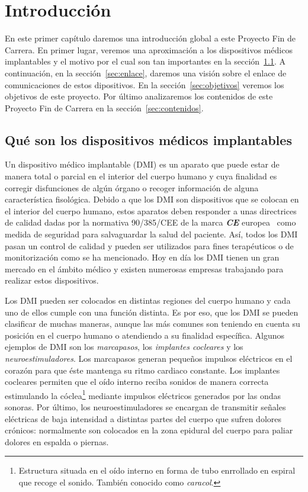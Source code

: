 \chapter{\textbf{Introducción}}\label{ch:intro}

En este primer capítulo daremos una introducción global a este Proyecto Fin de Carrera. En primer lugar, veremos una aproximación a los dispositivos médicos implantables y el motivo por el cual son tan importantes en la sección~\ref{sec:dmi}. A continuación, en la sección~\ref{sec:enlace}, daremos una visión sobre el enlace de comunicaciones de estos dipositivos. En la sección~\ref{sec:objetivos} veremos los objetivos de este proyecto. Por último analizaremos los contenidos de este Proyecto Fin de Carrera en la sección~\ref{sec:contenidos}.


\section{Qué son los dispositivos médicos implantables}\label{sec:dmi}

Un dispositivo médico implantable (DMI) es un aparato que puede estar de manera total o parcial en el interior del cuerpo humano y cuya finalidad es corregir disfunciones de algún órgano o recoger información de alguna característica fisológica. Debido a que los DMI son dispositivos que se colocan en el interior del cuerpo humano, estos aparatos deben responder a unas directrices de calidad dadas por la normativa 90/385/CEE \cite{ce385} de la marca \textbf{\textit{CE}} europea~\cite{ce} como medida de seguridad para salvaguardar la salud del paciente. Así, todos los DMI pasan un control de calidad y pueden ser utilizados para fines terapéuticos o de monitorización como se ha mencionado. Hoy en día los DMI tienen un gran mercado en el ámbito médico y existen numerosas empresas trabajando para realizar estos dispositivos.

Los DMI pueden ser colocados en distintas regiones del cuerpo humano y cada uno de ellos cumple con una función distinta. Es por eso, que los DMI se pueden clasificar de muchas maneras, aunque las más comunes son teniendo en cuenta su posición en el cuerpo humano o atendiendo a su finalidad específica. Algunos ejemplos de DMI son los \textit{marcapasos}, los \textit{implantes cocleares} y los \textit{neuroestimuladores}. Los marcapasos generan pequeños impulsos eléctricos en el corazón para que éste mantenga su ritmo cardiaco constante. Los implantes cocleares permiten que el oído interno reciba sonidos de manera correcta estimulando la cóclea\footnote{Estructura situada en el oído interno en forma de tubo enrrollado en espiral que recoge el sonido. También conocido como \textit{caracol}.} mediante impulsos eléctricos generados por las ondas sonoras. Por último, los neuroestimuladores se encargan de transmitir señales eléctricas de baja intensidad a distintas partes del cuerpo que sufren dolores crónicos: normalmente son colocados en la zona epidural del cuerpo para paliar dolores en espalda o piernas.

